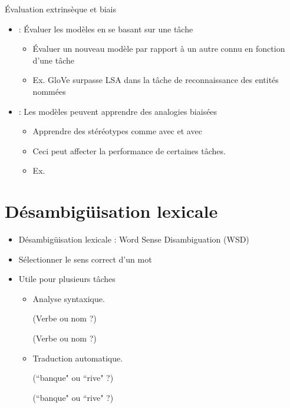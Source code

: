 \documentclass{KodeBook}
\begin{document}
Évaluation extrinsèque et biais

\begin{itemize}
	\item  {} : Évaluer les modèles en se basant sur une tâche 
	\begin{itemize}
		\item Évaluer un nouveau modèle par rapport à un autre connu en fonction d'une tâche
		\item Ex. GloVe surpasse LSA dans la tâche de reconnaissance des entités nommées \cite{2014-pennington-al}
	\end{itemize}
	\item {} : Les modèles peuvent apprendre des analogies biaisées
	\begin{itemize}
		\item Apprendre des stéréotypes comme  avec  et  avec  \cite{2017-caliskan-al}
		\item Ceci peut affecter la performance de certaines tâches. 
		\item Ex. 
	\end{itemize}
\end{itemize}

\section{Désambigüisation lexicale}

\begin{itemize}
	\item Désambigüisation lexicale : Word Sense Disambiguation (WSD)
	\item Sélectionner le sens correct d'un mot 
	\item Utile pour plusieurs tâches 
	\begin{itemize}
		\item Analyse syntaxique. 
		
		 (Verbe ou nom ?)
		
		 (Verbe ou nom ?)
		
		\item Traduction automatique. 
		
		 (``banque" ou ``rive" ?)
		
		 (``banque" ou ``rive" ?)
	\end{itemize}
\end{itemize}
\end{document}
